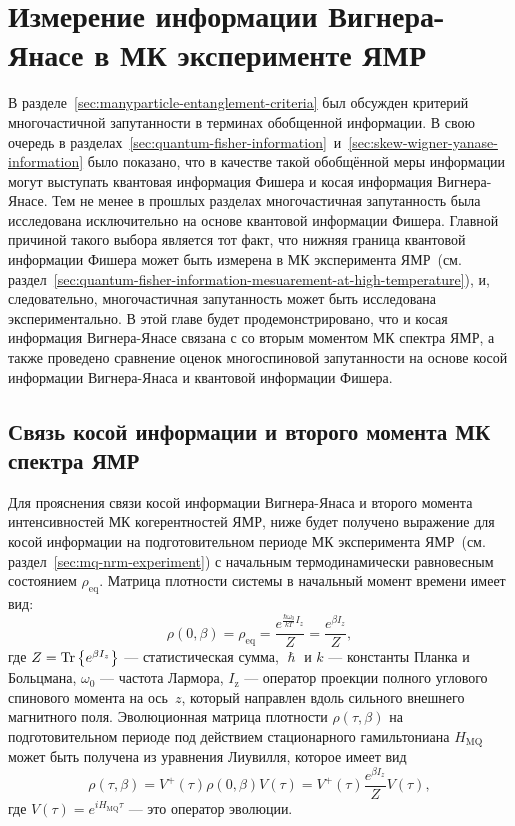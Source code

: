 \chapter{Измерение информации Вигнера-Янасе в МК эксперименте ЯМР}
\label{chapter:wyi-mesuarement}


В разделе~\ref{sec:manyparticle-entanglement-criteria} был обсужден критерий многочастичной запутанности
в терминах обобщенной информации.
В свою очередь в разделах~\ref{sec:quantum-fisher-information}~и~\ref{sec:skew-wigner-yanase-information}
было показано,
что в качестве такой обобщённой меры информации могут выступать
квантовая информация Фишера и косая информация Вигнера-Янасе.
Тем не менее в прошлых разделах многочастичная запутанность была исследована исключительно
на основе квантовой информации Фишера.
Главной причиной такого выбора является тот факт,
что нижняя граница квантовой информации Фишера может быть измерена в МК эксперимента ЯМР~(см.  раздел~\ref{sec:quantum-fisher-information-mesuarement-at-high-temperature}),
и, следовательно, многочастичная запутанность может быть исследована экспериментально.
В этой главе будет продемонстрировано,
что и косая информация Вигнера-Янасе связана с
со вторым моментом МК спектра ЯМР,
а также проведено сравнение оценок многоспиновой запутанности
на основе косой информации Вигнера-Янаса и квантовой информации Фишера.



\section{Связь косой информации и второго момента МК спектра ЯМР}
\label{sec:wyi-mesuarement}

Для прояснения связи косой информации Вигнера-Янаса и
второго момента интенсивностей МК когерентностей ЯМР,
ниже будет получено выражение для косой информации
на подготовительном периоде МК эксперимента ЯМР~(см. раздел~\ref{sec:mq-nrm-experiment})
с начальным термодинамически равновесным состоянием $\rho_\mathrm{eq}$.
Матрица плотности системы в начальный момент времени имеет вид:
\begin{equation}
  \rho(0, \beta)
  = \rho_\mathrm{eq}
  = \dfrac{e^{\frac{\hbar\omega_{0}}{kT} I_z}}{Z}
  = \dfrac{e^{\beta I_z}}{Z},
\end{equation}
где $Z = \mathrm{Tr} \left\{ e^{\beta I_z} \right\}$ --- статистическая сумма,
$\hslash$ и $k$ --- константы Планка и Больцмана,
$\omega_{0}$ --- частота Лармора,
$I_\mathrm{z}$ ---  оператор проекции полного углового спинового момента  на ось~$z$,
который направлен вдоль сильного внешнего магнитного поля.
Эволюционная матрица плотности $\rho(\tau,\beta)$ на подготовительном периоде
под действием стационарного гамильтониана $H_\mathrm{MQ}$
может быть получена из уравнения Лиувилля,
которое имеет вид
%
\begin{equation}\label{eq:rho-eval}
  \rho(\tau,\beta)
  = V^+(\tau) \rho(0, \beta) V(\tau)
  = V^+(\tau) \frac{e^{\beta I_z}}{Z} V(\tau),
\end{equation}
где $V(\tau) = e^{iH_\mathrm{MQ}\tau}$
--- это оператор эволюции.

